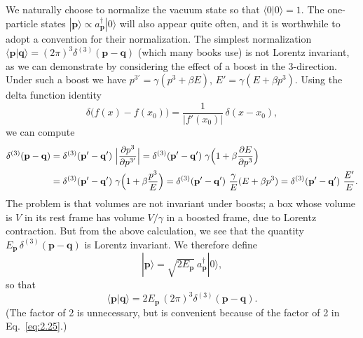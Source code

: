 We naturally choose to normalize the vacuum state so that
$\langle 0|0\rangle = 1$.  The one-particle states
$|\mathbf{p}\rangle \propto a_{\mathbf{p}}^\dagger|0\rangle$ will also
appear quite often, and it is worthwhile to adopt a convention for their
normalization.  The simplest normalization
$\langle\mathbf{p}|\mathbf{q}\rangle = (2\pi)^3\delta^{(3)}
(\mathbf{p}-\mathbf{q})$ (which many books use) is not Lorentz invariant,
as we can demonstrate by considering the effect of a boost in the
3-direction.  Under such a boost we have
$p^{3'} = \gamma(p^3+\beta E)$, $E' = \gamma(E+\beta p^3)$.  Using the
delta function identity
\begin{equation}
  \delta\bigl( f(x) - f(x_0) \bigr) =
    \frac{1}{|f'(x_0)|}\,\delta(x-x_0),
  \label{eq:2.34}
\end{equation}
we can compute
\begin{align}
  \delta^{(3)}(\mathbf{p}-\mathbf{q})
  &= \delta^{(3)}(\mathbf{p}'-\mathbf{q}')\
    \Bigl|\frac{\partial p^3}{\partial p^{3'}}\Bigr|
  = \delta^{(3)}(\mathbf{p}'-\mathbf{q}')\
    \gamma\Bigl(1+\beta\frac{\partial E}{\partial p^3}\Bigr)\\
  &= \delta^{(3)}(\mathbf{p}'-\mathbf{q}')\
    \gamma\Bigl(1+\beta\frac{p^3}{E}\Bigr)
  = \delta^{(3)}(\mathbf{p}'-\mathbf{q}')\
    \frac{\gamma}{E}(E+\beta p^3)
  = \delta^{(3)}(\mathbf{p}'-\mathbf{q}')\ \frac{E'}{E} .
\end{align}
The problem is that volumes are not invariant under boosts; a box whose
volume is $V$ in its rest frame has volume $V/\gamma$ in a boosted frame,
due to Lorentz contraction.  But from the above calculation, we see that
the quantity $E_{\mathbf{p}}\,\delta^{(3)}(\mathbf{p}-\mathbf{q})$ is
Lorentz invariant.  We therefore define
\begin{equation}
  |\mathbf{p}\rangle = \sqrt{2E_{\mathbf{p}}}\ a_{\mathbf{p}}^\dagger |0\rangle,
  \label{eq:2.35}
\end{equation}
so that
\begin{equation}
  \langle\mathbf{p}|\mathbf{q}\rangle
    = 2E_{\mathbf{p}}\,(2\pi)^3\delta^{(3)}(\mathbf{p}-\mathbf{q}).
  \label{eq:2.36}
\end{equation}
(The factor of 2 is unnecessary, but is convenient because of the factor
of 2 in Eq.~\eqref{eq:2.25}.)

